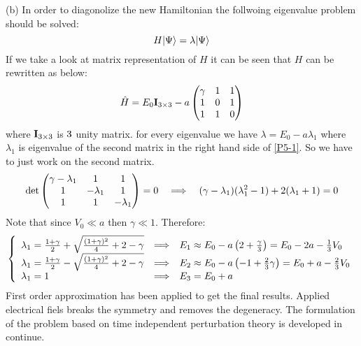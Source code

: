 \begin{homeworkProblem}
\begin{homeworkSection}{(b)}
In order to diagonolize the new Hamiltonian the follwoing eigenvalue problem should be solved:
\begin{equation}
H|\Psi\rangle=\lambda|\Psi\rangle
\end{equation} 
If we take a look at matrix representation of $H$ it can be seen that $H$ can be rewritten as below:
\begin{equation}\label{P5-1}
\Hat{H}=E_0\mathbf{I}_{3\times 3}-a
\begin{pmatrix}
\gamma & 1 &1\\
1&0& 1\\
1&1&0
\end{pmatrix}
\end{equation}
where $\mathbf{I}_{3\times 3}$ is $3\time 3$ unity matrix.
 for every eigenvalue we have $\lambda=E_0-a\lambda_1$ where $\lambda_1$ is eigenvalue of the second matrix in the right hand side of \eqref{P5-1}. So we have to just work on the second matrix. 
 \begin{equation}
 \det
 \begin{pmatrix}
\gamma-\lambda_1 & 1 &1\\
1&-\lambda_1 & 1\\
1 & 1 & -\lambda_1
\end{pmatrix}
=0
\quad\Longrightarrow\quad
(\gamma-\lambda_1)(\lambda_1^2-1)+2(\lambda_1+1)=0
 \end{equation}
Note that since $V_0\ll a$ then $\gamma\ll 1$. Therefore:
\begin{equation}
\left\{
\begin{array}{lcl}
\lambda_1=\frac{1+\gamma}{2}+\sqrt{\frac{(1+\gamma)^2}{4}+2-\gamma}&\Longrightarrow & E_1\approx E_0-a\left(2+\frac{\gamma}{3}\right)=E_0-2a-\frac{1}{3}V_0\\
\lambda_1=\frac{1+\gamma}{2}-\sqrt{\frac{(1+\gamma)^2}{4}+2-\gamma}&\Longrightarrow & E_2\approx E_0-a\left(-1+\frac{2}{3}\gamma\right)=E_0+a-\frac{2}{3}V_0\\
\lambda_1=1 &\Longrightarrow& E_3=E_0+a
\end{array}
\right.
\end{equation}
First order approximation  has been applied  to get the final results. Applied electrical fiels breaks the symmetry and removes the degeneracy. The formulation of the problem based on time independent perturbation theory is developed in continue. 


\end{homeworkSection}
\end{homeworkProblem}
